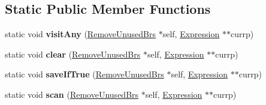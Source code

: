 \subsection*{Static Public Member Functions}
\begin{DoxyCompactItemize}
\item 
\mbox{\label{structwasm_1_1_remove_unused_brs_a4cf5b39cda93b6d64da8914d80717def}} 
static void {\bfseries visit\+Any} (\mbox{\hyperlink{structwasm_1_1_remove_unused_brs}{Remove\+Unused\+Brs}} $\ast$self, \mbox{\hyperlink{classwasm_1_1_expression}{Expression}} $\ast$$\ast$currp)
\item 
\mbox{\label{structwasm_1_1_remove_unused_brs_a6ac6af547760c65128c7bcc546c15805}} 
static void {\bfseries clear} (\mbox{\hyperlink{structwasm_1_1_remove_unused_brs}{Remove\+Unused\+Brs}} $\ast$self, \mbox{\hyperlink{classwasm_1_1_expression}{Expression}} $\ast$$\ast$currp)
\item 
\mbox{\label{structwasm_1_1_remove_unused_brs_aa62fc1bc17d9e913f897fd18bdb136d1}} 
static void {\bfseries save\+If\+True} (\mbox{\hyperlink{structwasm_1_1_remove_unused_brs}{Remove\+Unused\+Brs}} $\ast$self, \mbox{\hyperlink{classwasm_1_1_expression}{Expression}} $\ast$$\ast$currp)
\item 
\mbox{\label{structwasm_1_1_remove_unused_brs_a8b859f26d07f46174f7a842da7c6cb45}} 
static void {\bfseries scan} (\mbox{\hyperlink{structwasm_1_1_remove_unused_brs}{Remove\+Unused\+Brs}} $\ast$self, \mbox{\hyperlink{classwasm_1_1_expression}{Expression}} $\ast$$\ast$currp)
\end{DoxyCompactItemize}
